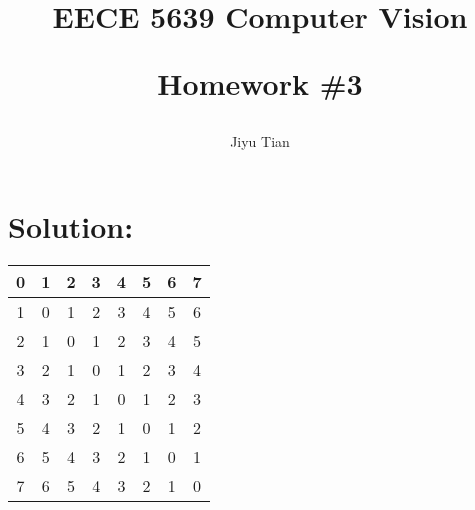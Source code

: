 \documentclass[12pt]{article}
\title{EECE 5639 Computer Vision\\ [2ex] \begin{large} Homework \#3 \end{large} }
\author{Jiyu Tian}
\date{}
\begin{document}
\maketitle
\pagestyle{empty}
\section{Solution:}
\begin{table*}[h]
\centering
\begin{tabular}{|c|c|c|c|c|c|c|c|}
\hline
0 & 1 & 2 & 3 & 4 & 5 & 6 & 7\\
\hline
1 & 0 & 1 & 2 & 3 & 4 & 5 & 6\\
\hline
2 & 1 & 0 & 1 & 2 & 3 & 4 & 5\\
\hline
3 & 2 & 1 & 0 & 1 & 2 & 3 & 4\\
\hline
4 & 3 & 2 & 1 & 0 & 1 & 2 & 3\\
\hline
5 & 4 & 3 & 2 & 1 & 0 & 1 & 2\\
\hline
6 & 5 & 4 & 3 & 2 & 1 & 0 & 1\\
\hline
7 & 6 & 5 & 4 & 3 & 2 & 1 & 0\\
\hline
\end{tabular}
\end{table*}
\end{document}
